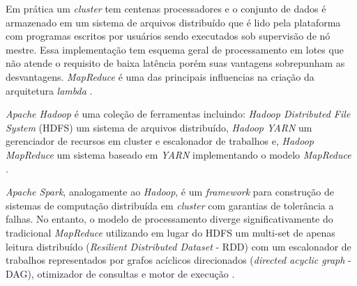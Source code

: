 Em prática um \emph{cluster} tem centenas processadores e o conjunto de dados é
armazenado em um sistema de arquivos distribuído que é lido pela plataforma com
programas escritos por usuários sendo executados sob supervisão de nó mestre.
Essa implementação tem esquema geral de processamento em lotes que não atende o
requisito de baixa latência porém suas vantagens sobrepunham as desvantagens.
\emph{MapReduce} é uma das principais influencias na criação da arquitetura
\emph{lambda} \cite{marz2015big}.

\emph{Apache Hadoop} é uma coleção de ferramentas incluindo: \emph{Hadoop
Distributed File System} (HDFS) um sistema de arquivos distribuído, \emph{Hadoop
YARN} um gerenciador de recursos em cluster e escalonador de trabalhos e,
\emph{Hadoop MapReduce} um sistema baseado em \emph{YARN} implementando o modelo
\emph{MapReduce} \cite{ApacheHadoop2020}.





\emph{Apache Spark}, analogamente ao \emph{Hadoop}, é um \emph{framework} para
construção de sistemas de computação distribuída em \emph{cluster} com garantias
de tolerância a falhas. No entanto, o modelo de processamento diverge
significativamente do tradicional \emph{MapReduce} utilizando em lugar do HDFS
um multi-set de apenas leitura distribuído (\emph{Resilient Distributed Dataset}
- RDD) com um escalonador de trabalhos representados por grafos acíclicos
direcionados (\emph{directed acyclic graph} - DAG), otimizador de consultas e
motor de execução \cite{ApacheSpark2020}.

